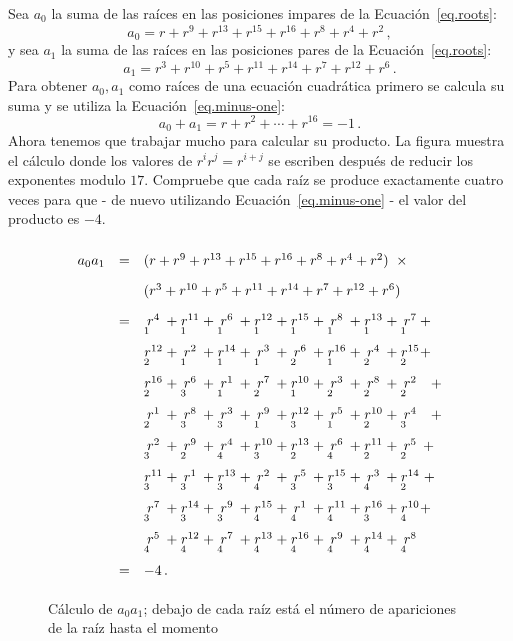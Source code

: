 Sea $a_0$ la suma de las raíces en las posiciones impares de la Ecuación~\ref{eq.roots}:
\[
a_0=r + r^9 + r^{13} +r^{15} +r^{16} + r^8+r^4+r^2\,,
\]
y sea $a_1$ la suma de las raíces en las posiciones pares de la Ecuación~\ref{eq.roots}:
\[
a_1=r^3 + r^{10} + r^{5} +r^{11} +r^{14} + r^7+r^{12}+r^6\,.
\]
Para obtener $a_0,a_1$ como raíces de una ecuación cuadrática primero se calcula su suma y se utiliza la Ecuación~\ref{eq.minus-one}:
\[
a_0+a_1=r + r^2 + \cdots +r^{16}=-1\,.
\]
Ahora tenemos que trabajar mucho para calcular su producto. La figura muestra el cálculo donde los valores de $r^ir^j=r^{i+j}$ se escriben después de reducir los exponentes modulo $17$. Compruebe que cada raíz se produce exactamente cuatro veces para que - de nuevo utilizando Ecuación~\ref{eq.minus-one} - el valor del producto es $-4$.

\begin{figure}[t]
\[
\renewcommand{\arraystretch}{1.8}
\begin{array}{lcl}
a_0a_1&=&(r + r^9 + r^{13} +r^{15} +r^{16} + r^8+r^4+r^2)\;\;\times\\
&&(r^3 + r^{10} + r^{5} +r^{11} +r^{14} + r^7+r^{12}+r^6)\\
&=&\occ{4}{1} + \occ{11}{1} + \occ{6}{1} + \occ{12}{1} + \occ{15}{1} + \occ{8}{1} + \occ{13}{1} + \occ{7}{1} +\\
&&\occ{12}{2} + \occ{2}{1} + \occ{14}{1} + \occ{3}{1} + \occ{6}{2} + \occ{16}{1} + \occ{4}{2} + \occ{15}{2} +\\
&&\occ{16}{2} + \occ{6}{3} + \occ{1}{1} + \occ{7}{2} + \occ{10}{1} + \occ{3}{2} + \occ{8}{2} + \occ{2}{2}\;\;\: +\\
&&\occ{1}{2} + \occ{8}{3} + \occ{3}{3} + \occ{9}{1} + \occ{12}{3} + \occ{5}{1} + \occ{10}{2} + \occ{4}{3}\;\;\: +\\
&&\occ{2}{3} + \occ{9}{2} + \occ{4}{4} + \occ{10}{3} + \occ{13}{2} + \occ{6}{4} + \occ{11}{2} + \occ{5}{2} \:+\\
&&\occ{11}{3} + \occ{1}{3} + \occ{13}{3} + \occ{2}{4} + \occ{5}{3} + \occ{15}{3} + \occ{3}{4} + \occ{14}{2} \;+\\
&&\occ{7}{3} + \occ{14}{3} + \occ{9}{3} + \occ{15}{4} + \occ{1}{4} + \occ{11}{4} + \occ{16}{3} + \occ{10}{4} +\\
&&\occ{5}{4} + \occ{12}{4} + \occ{7}{4} + \occ{13}{4} + \occ{16}{4} + \occ{9}{4} + \occ{14}{4} + \occ{8}{4}\\
&=&-4\,.
\end{array}
\]
\caption{Cálculo de $a_0a_1$; debajo de cada raíz está el número de apariciones de la raíz hasta el momento}\label{fig.a0a1}
\end{figure}

